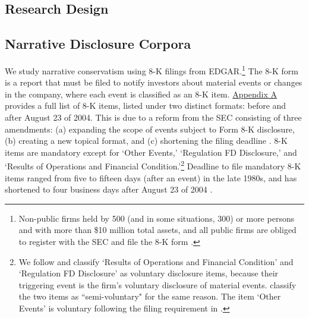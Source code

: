 \documentclass[letterpaper,12pt]{article}
\begin{document}
\begin{spacing}{1.5}
\begin{comment}
Aligned with the prior literature on the usefulness of conservatism, we argue that more complete, news-consistent and timely disclosure of bad news relative to good news enhances contract efficiency [specific hypotheses to be developed]. However, we do not make claims about the valuation role of narrative conservatism.

\end{comment}

\section{Research Design}
\subsection{Narrative Disclosure Corpora} \label{sec3.1}
\noindent We study narrative conservatism using 8-K filings from EDGAR.\footnote{Non-public firms held by 500 (and in some situations, 300) or more persons and with more than \$10 million total assets, and all public firms are obliged to register with the SEC and file the 8-K form \cite{segalAreManagersStrategic2016}.} The 8-K form is a report that must be filed to notify investors about material events or changes in the company, where each event is classified as an 8-K item. \hyperref[appa]{Appendix A} provides a full list of 8-K items, listed under two distinct formats: before and after August 23 of 2004. This is due to a reform from the SEC consisting of three amendments: (a) expanding the scope of events subject to Form 8-K disclosure, (b) creating a new topical format, and (c) shortening the filing deadline \cite{secFinalRuleAdditional2004, lermanNewForm8K2010}. 8-K items are mandatory except for `Other Events,'  `Regulation FD Disclosure,' and `Results of Operations and Financial Condition.'\footnote{We follow  and classify `Results of Operations and Financial Condition' and `Regulation FD Disclosure' as voluntary disclosure items, because their triggering event is the firm's voluntary disclosure of material events.  classify the two items as ``semi-voluntary" for the same reason. The item `Other Events' is voluntary following the filing requirement in . } Deadline to file mandatory 8-K items ranged from five to fifteen days (after an event) in the late 1980s, and has shortened to four business days after August 23 of 2004 \cite{lermanNewForm8K2010}.


\end{spacing}
\end{document}
